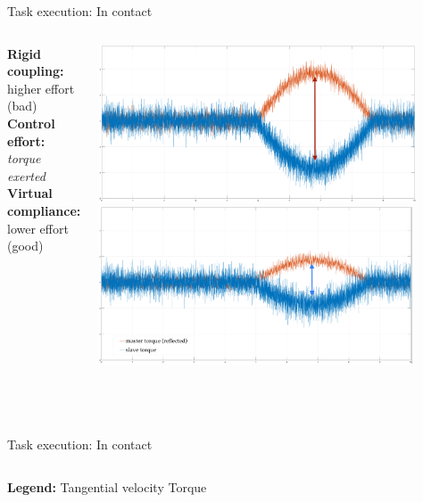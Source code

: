 \documentclass[10pt]{beamer}
\begin{document}
\begin{frame}{Task execution: In contact}
  \smallskip
  \begin{columns}
    \color{Orange}\textbf{Rigid coupling:}\\
    higher effort (bad)\\
    \bigskip
    \bigskip
    \color{black}\textbf{Control effort:}\\
    \textsl{torque exerted}\\
    \bigskip
    \bigskip
    \color{LightBlue}\textbf{Virtual compliance:}\\
    lower effort (good)

    \includegraphics[width=\textwidth,
    height=0.43\textwidth]{../reportTeleop/Images/rigidContactReacTorArrow}
    \smallskip
    \includegraphics[width=\textwidth,
    height=0.43\textwidth]{../reportTeleop/Images/setPointContactReacTorArrow}\\

 \end{columns}
\end{frame}


\begin{frame}{Task execution: In contact}
  \begin{center}
  \end{center}
  \begin{columns}
    \textbf{Legend:}
    \color{LightBlue} Tangential velocity
    \color{Orange} Torque
  \end{columns}
\end{frame}
\end{document}
